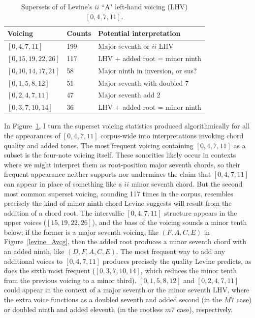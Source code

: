 \begin{table}%
  \caption{Supersets of of Levine's $ii$ ``A" left-hand voicing (LHV) $[0,4,7,11]$.}
  \centering
\begin{tabular}{l| l | l}
\hline\hline
Voicing & Counts & Potential interpretation \\ [0.5ex]
\hline
$[0,4,7,11]$ & 199 & Major seventh or $ii$ LHV\\
$[0,15,19,22,26]$ & 117 & LHV + added root = minor ninth \\
$[0,10,14,17,21]$ & 58 & Major ninth in inversion, or sus? \\
$[0,1,5,8,12]$ & 51 & Major seventh with doubled 7 \\
$[0,2,4,7,11]$ & 47 & Major seventh add 2 \\
$[0,3,7,10,14]$ & 36 & LHV + added root = minor ninth \\[1ex]
\hline
\end{tabular}
\label{a_ii_lhv}
\end{table}

In Figure~\ref{a_ii_lhv}, I turn the superset voicing statistics produced algorithmically for all the appearances of $[0,4,7,11]$ corpus-wide into interpretations invoking chord quality and added tones.  The most frequent voicing containing $[0,4,7,11]$ as a subset is the four-note voicing itself.  These sonorities likely occur in contexts where we might interpret them as root-position major seventh chords, so their frequent appearance neither supports nor undermines the claim that $[0,4,7,11]$ can appear in place of something like a $ii$ minor seventh chord.  But the second most common superset voicing, sounding 117 times in the corpus, resembles precisely the kind of minor ninth chord Levine suggests will result from the addition of a chord root.  The intervallic $[0,4,7,11]$ structure appears in the upper voices ($[15,19,22,26]$), and the bass of the voicing sounds a minor tenth below; if the former is a major seventh voicing, like $(F,A,C,E)$ in Figure~\ref{levine_Avcg}, then the added root produces a minor seventh chord with an added ninth, like $(D,F,A,C,E)$.  The most frequent way to add any additional voices to $[0,4,7,11]$ produces precisely the quality Levine predicts, as does the sixth most frequent ($[0,3,7,10,14]$, which reduces the minor tenth from the previous voicing to a minor third).  $[0,1,5,8,12]$ and $[0,2,4,7,11]$ could appear in the context of a major seventh or the minor seventh LHV, where the extra voice functions as a doubled seventh and added second (in the $M7$ case) or doubled ninth and added eleventh (in the rootless $m7$ case), respectively.

